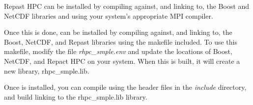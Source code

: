 Repast HPC can be installed by compiling against, and linking to, the Boost and NetCDF libraries and using your system's appropriate MPI compiler.

Once this is done, \rhpc can be installed by compiling against, and linking to, the Boost, NetCDF, and Repast libraries using the makefile included. To use this makefile, modify the file \textit{rhpc\_smple.env} and update the locations of Boost, NetCDF, and Repact HPC on your system. When this is built, it will create a new library, rhpc\_smple.lib. %

Once \rhpc is installed, you can compile using the header files in the \textit{include} directory, and build linking to the rhpc\_smple.lib library. %



